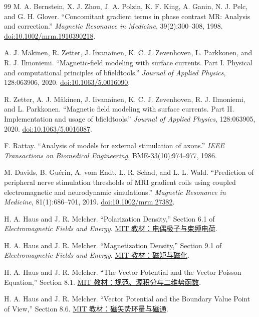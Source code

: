 \begin{thebibliography}{99}
 M. A. Bernstein, X. J. Zhou, J. A. Polzin, K. F. King, A. Ganin, N. J. Pelc, and G. H. Glover. ``Concomitant gradient terms in phase contrast MR: Analysis and correction.'' \emph{Magnetic Resonance in Medicine}, 39(2):300--308, 1998. \href{https://doi.org/10.1002/mrm.1910390218}{doi:10.1002/mrm.1910390218}.

 A. J. M\"akinen, R. Zetter, J. Iivanainen, K. C. J. Zevenhoven, L. Parkkonen, and R. J. Ilmoniemi. ``Magnetic-field modeling with surface currents. Part I. Physical and computational principles of bfieldtools.'' \emph{Journal of Applied Physics}, 128:063906, 2020. \href{https://doi.org/10.1063/5.0016090}{doi:10.1063/5.0016090}.

 R. Zetter, A. J. M\"akinen, J. Iivanainen, K. C. J. Zevenhoven, R. J. Ilmoniemi, and L. Parkkonen. ``Magnetic field modeling with surface currents. Part II. Implementation and usage of bfieldtools.'' \emph{Journal of Applied Physics}, 128:063905, 2020. \href{https://doi.org/10.1063/5.0016087}{doi:10.1063/5.0016087}.

 F. Rattay. ``Analysis of models for external stimulation of axons.'' \emph{IEEE Transactions on Biomedical Engineering}, BME-33(10):974--977, 1986.

 M. Davids, B. Gu\'erin, A. vom Endt, L. R. Schad, and L. L. Wald. ``Prediction of peripheral nerve stimulation thresholds of MRI gradient coils using coupled electromagnetic and neurodynamic simulations.'' \emph{Magnetic Resonance in Medicine}, 81(1):686--701, 2019. \href{https://doi.org/10.1002/mrm.27382}{doi:10.1002/mrm.27382}.

 H. A. Haus and J. R. Melcher. ``Polarization Density,'' Section 6.1 of \emph{Electromagnetic Fields and Energy}. \href{https://web.mit.edu/6.013_book/www/chapter6/6.1.html}{MIT 教材：电偶极子与束缚电荷}.

 H. A. Haus and J. R. Melcher. ``Magnetization Density,'' Section 9.1 of \emph{Electromagnetic Fields and Energy}. \href{https://web.mit.edu/6.013_book/www/chapter9/9.1.html}{MIT 教材：磁矩与磁化}.

 H. A. Haus and J. R. Melcher. ``The Vector Potential and the Vector Poisson Equation,'' Section 8.1. \href{https://web.mit.edu/6.013_book/www/chapter8/8.1.html}{MIT 教材：规范、源积分与二维势函数}.

 H. A. Haus and J. R. Melcher. ``Vector Potential and the Boundary Value Point of View,'' Section 8.6. \href{https://web.mit.edu/6.013_book/www/chapter8/8.6.html}{MIT 教材：磁矢势环量与磁通}.


\end{thebibliography}
